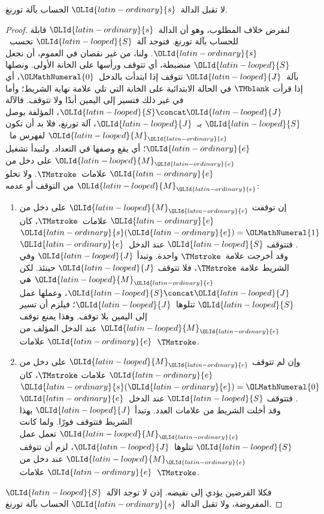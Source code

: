 \documentclass[../../../include/open-logic-section]{subfiles}
\begin{document}
\begin{lem}
لا تقبل الدالة~$\OLId{latin-ordinary}{s}$ الحساب بآلة تورنغ.
\end{lem}

\begin{proof}
لنفرض خلاف المطلوب، وهو أن الدالة~$\OLId{latin-ordinary}{s}$ قابلة للحساب بآلة تورنغ.
فتوجد آلة~$\OLId{latin-looped}{S}$ تحسب~$\OLId{latin-ordinary}{s}$. ولنا، من غير نقصان في العموم، أن نجعل
$\OLId{latin-looped}{S}$ منضبطة، أي تتوقف ورأسها على الخانة الأولى. ونصلها بآلة~$\OLId{latin-looped}{J}$
تتوقف إذا ابتدأت بالدخل~$\OLMathNumeral{0}$، أي إذا قرأت $\TMblank$ في الحالة
الابتدائية على الخانة التي تلي علامة نهاية الشريط؛ وأما في غير
ذلك فتسير إلى اليمين أبدًا ولا تتوقف. فالآلة $\OLId{latin-looped}{S}\concat \OLId{latin-looped}{J}$،
المؤلفة بوصل $\OLId{latin-looped}{S}$ بـ~$\OLId{latin-looped}{J}$، آلة تورنغ، فلا بد أن تكون $\OLId{latin-looped}{M}_\OLId{latin-ordinary}{e}$
لفهرس ما~$\OLId{latin-ordinary}{e}$؛ أي يقع وصفها في التعداد. ولنبدأ تشغيل $\OLId{latin-looped}{M}_\OLId{latin-ordinary}{e}$
على دخل من $\OLId{latin-ordinary}{e}$ علامات~$\TMstroke$. ولا تخلو $\OLId{latin-looped}{M}_\OLId{latin-ordinary}{e}$ من التوقف
أو عدمه:
\begin{enumerate}
\item إن توقفت $\OLId{latin-looped}{M}_\OLId{latin-ordinary}{e}$ على دخل من $\OLId{latin-ordinary}{e}$ علامات~$\TMstroke$،
  كان $\OLId{latin-ordinary}{s}(\OLId{latin-ordinary}{e})=\OLMathNumeral{1}$. فتتوقف $\OLId{latin-looped}{S}$ عند الدخل~$\OLId{latin-ordinary}{e}$ وقد أخرجت
  علامة~$\TMstroke$ واحدة. وتبدأ $\OLId{latin-looped}{J}$ وفي الشريط علامة
  $\TMstroke$، فلا تتوقف $\OLId{latin-looped}{J}$ حينئذ. لكن $\OLId{latin-looped}{M}_\OLId{latin-ordinary}{e}$ هي
  $\OLId{latin-looped}{S}\concat \OLId{latin-looped}{J}$، وعملها عمل $\OLId{latin-looped}{S}$ تتلوها~$\OLId{latin-looped}{J}$؛ فيلزم أن تسير
  إلى اليمين بلا توقف. وهذا يمنع توقف $\OLId{latin-looped}{M}_\OLId{latin-ordinary}{e}$ عند الدخل المؤلف
  من $\OLId{latin-ordinary}{e}$ علامات~$\TMstroke$.

\item وإن لم تتوقف $\OLId{latin-looped}{M}_\OLId{latin-ordinary}{e}$ على دخل من $\OLId{latin-ordinary}{e}$ علامات
  $\TMstroke$، كان $\OLId{latin-ordinary}{s}(\OLId{latin-ordinary}{e})=\OLMathNumeral{0}$. فتتوقف $\OLId{latin-looped}{S}$ عند الدخل~$\OLId{latin-ordinary}{e}$
  وقد أخلت الشريط من علامات العدد. وتبدأ $\OLId{latin-looped}{J}$ بهذا الشريط فتتوقف
  فورًا. ولما كانت $\OLId{latin-looped}{M}_\OLId{latin-ordinary}{e}$ تعمل عمل $\OLId{latin-looped}{S}$ تتلوها~$\OLId{latin-looped}{J}$، لزم أن
  تتوقف $\OLId{latin-looped}{M}_\OLId{latin-ordinary}{e}$ عند دخل من $\OLId{latin-ordinary}{e}$ علامات~$\TMstroke$.
\end{enumerate}
فكلا الفرضين يؤدي إلى نقيضه. إذن لا توجد الآلة~$\OLId{latin-looped}{S}$ المفروضة،
ولا تقبل الدالة~$\OLId{latin-ordinary}{s}$ الحساب بآلة تورنغ.
\end{proof}
\end{document}
